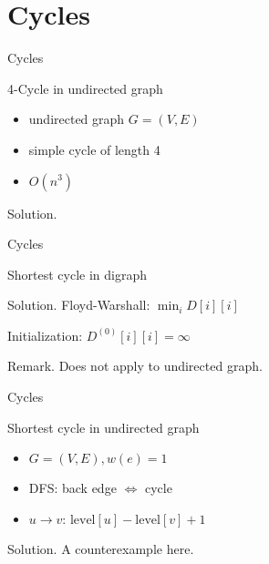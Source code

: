 \section{Cycles}

\begin{frame}{Cycles}
  \begin{exampleblock}{4-Cycle in undirected graph }
    \begin{itemize}
      \item undirected graph $G = (V, E)$
      \item simple cycle of length 4
      \item $O(n^{3})$
    \end{itemize}
  \end{exampleblock}

  \begin{block}{Solution.}
    
  \end{block}
\end{frame}
\begin{frame}{Cycles}
  \begin{exampleblock}{Shortest cycle in digraph }
    
  \end{exampleblock}

  \begin{block}{Solution.}
    Floyd-Warshall: $\min_{i}D[i][i]$

    Initialization: $D^{(0)}[i][i] = \infty$
  \end{block}
  
  \begin{alertblock}{Remark.}
    Does not apply to undirected graph.
  \end{alertblock}
\end{frame}
\begin{frame}{Cycles}
  \begin{exampleblock}{Shortest cycle in undirected graph }
    \begin{itemize}
      \item $G = (V, E), w(e) = 1$
      \item DFS: back edge $\iff$ cycle
      \item $u \to v$: $\text{level}[u] - \text{level}[v] + 1$
    \end{itemize}
  \end{exampleblock}

  \begin{block}{Solution.}
    A counterexample here. 
  \end{block}
\end{frame}
